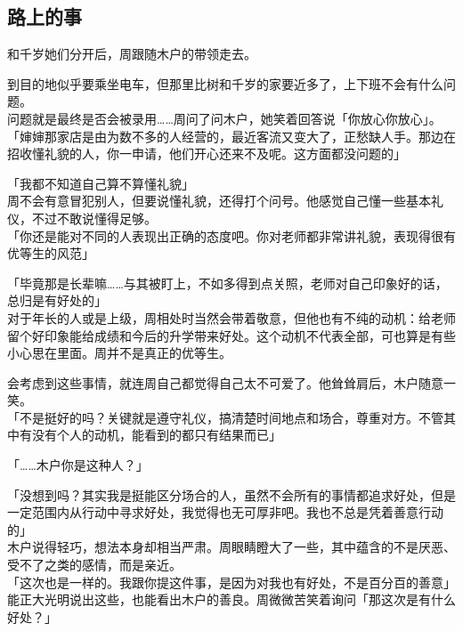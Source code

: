 \subsection{路上的事}

和千岁她们分开后，周跟随木户的带领走去。

到目的地似乎要乘坐电车，但那里比树和千岁的家要近多了，上下班不会有什么问题。\\

问题就是最终是否会被录用……周问了问木户，她笑着回答说「你放心你放心」。\\

「婶婶那家店是由为数不多的人经营的，最近客流又变大了，正愁缺人手。那边在招收懂礼貌的人，你一申请，他们开心还来不及呢。这方面都没问题的」

「我都不知道自己算不算懂礼貌」\\

周不会有意冒犯别人，但要说懂礼貌，还得打个问号。他感觉自己懂一些基本礼仪，不过不敢说懂得足够。\\

「你还是能对不同的人表现出正确的态度吧。你对老师都非常讲礼貌，表现得很有优等生的风范」

「毕竟那是长辈嘛……与其被盯上，不如多得到点关照，老师对自己印象好的话，总归是有好处的」\\

对于年长的人或是上级，周相处时当然会带着敬意，但他也有不纯的动机：给老师留个好印象能给成绩和今后的升学带来好处。这个动机不代表全部，可也算是有些小心思在里面。周并不是真正的优等生。

会考虑到这些事情，就连周自己都觉得自己太不可爱了。他耸耸肩后，木户随意一笑。\\

「不是挺好的吗？关键就是遵守礼仪，搞清楚时间地点和场合，尊重对方。不管其中有没有个人的动机，能看到的都只有结果而已」

「……木户你是这种人？」

「没想到吗？其实我是挺能区分场合的人，虽然不会所有的事情都追求好处，但是一定范围内从行动中寻求好处，我觉得也无可厚非吧。我也不总是凭着善意行动的」\\

木户说得轻巧，想法本身却相当严肃。周眼睛瞪大了一些，其中蕴含的不是厌恶、受不了之类的感情，而是亲近。\\

「这次也是一样的。我跟你提这件事，是因为对我也有好处，不是百分百的善意」\\

能正大光明说出这些，也能看出木户的善良。周微微苦笑着询问「那这次是有什么好处？」\\

